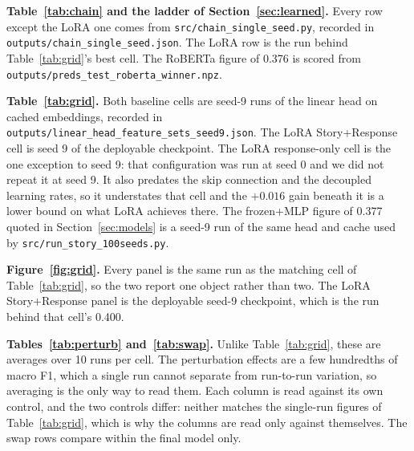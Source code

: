 \documentclass[11pt,a4paper]{article}
\begin{document}
\textbf{Table~\ref{tab:chain} and the ladder of Section~\ref{sec:learned}.} Every row except
the LoRA one comes from \texttt{src/chain\_single\_seed.py}, recorded in
\texttt{outputs/chain\_single\_seed.json}. The LoRA row is the run behind
Table~\ref{tab:grid}'s best cell. The RoBERTa figure of 0.376 is scored from
\texttt{outputs/preds\_test\_roberta\_winner.npz}.

\textbf{Table~\ref{tab:grid}.} Both baseline cells are seed-9 runs of the linear head on
cached embeddings, recorded in \texttt{outputs/linear\_head\_feature\_sets\_seed9.json}. The
LoRA Story+Response cell is seed 9 of the deployable checkpoint. The LoRA response-only cell
is the one exception to seed 9: that configuration was run at seed 0 and we did not repeat
it at seed 9. It also predates the skip connection and the decoupled learning rates, so it
understates that cell and the $+0.016$ gain beneath it is a lower bound on what LoRA
achieves there. The
frozen+MLP figure of 0.377 quoted in Section~\ref{sec:models} is a seed-9 run of the same
head and cache used by \texttt{src/run\_story\_100seeds.py}.

\textbf{Figure~\ref{fig:grid}.} Every panel is the same run as the matching cell of
Table~\ref{tab:grid}, so the two report one object rather than two. The LoRA Story+Response
panel is the deployable seed-9 checkpoint, which is the run behind that cell's 0.400.

\textbf{Tables~\ref{tab:perturb} and~\ref{tab:swap}.} Unlike Table~\ref{tab:grid}, these are
averages over 10 runs per cell. The perturbation effects are a few hundredths of macro F1, which a single run
cannot separate from run-to-run variation, so averaging is the only way to read them. Each
column is read against its own control, and the two controls differ: neither matches the
single-run figures of Table~\ref{tab:grid}, which is why the columns are read only against
themselves. The swap rows compare within the final model only.
\end{document}
